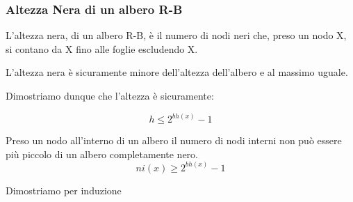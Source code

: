 \subsubsection{Altezza Nera di un albero R-B}
L'altezza nera, di un albero R-B, è il numero di nodi neri che, preso un nodo X, si contano da X fino alle foglie escludendo X.

L'altezza nera è sicuramente minore dell'altezza dell'albero e al massimo uguale.

Dimostriamo dunque che l'altezza è sicuramente:

$$h \le 2^{bh(x)}-1$$

Preso un nodo all'interno di un albero il numero di nodi interni non può essere più piccolo di un albero completamente nero.
$$ n i(x) \ge 2^{bh(x)} -1 $$

Dimostriamo per induzione

